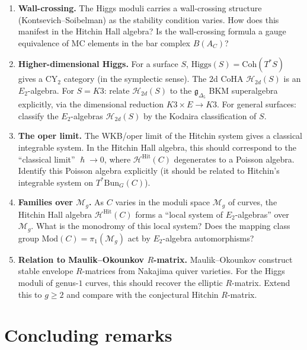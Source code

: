 \documentclass[11pt]{article}
\theoremstyle{garamondthm}
\theoremstyle{garamonddef}
\theoremstyle{garamondrem}
\newcommand{\Coh}{\mathrm{Coh}}
\newcommand{\CY}{\mathrm{CY}}
\newcommand{\Etwo}{E_2}
\newcommand{\cH}{\mathcal{H}}
\newcommand{\cM}{\mathcal{M}}
\newcommand{\frakg}{\mathfrak{g}}
\renewcommand{\hbar}{\hslash}
\newcommand{\Higgs}{\mathrm{Higgs}}
\newcommand{\Bun}{\mathrm{Bun}}
\newcommand{\Hit}{\mathrm{Hit}}
\begin{document}
\begin{enumerate}[label=\textbf{Q\arabic*.}]
\item \textbf{Wall-crossing.} The Higgs moduli carries a wall-crossing structure (Kontsevich--Soibelman) as the stability condition varies. How does this manifest in the Hitchin Hall algebra? Is the wall-crossing formula a gauge equivalence of MC elements in the bar complex $B(A_C)$?

\item \textbf{Higher-dimensional Higgs.} For a surface $S$, $\Higgs(S) = \Coh(T^*S)$ gives a $\CY_2$ category (in the symplectic sense). The $2$d CoHA $\cH_{2d}(S)$ is an $\Etwo$-algebra. For $S = K3$: relate $\cH_{2d}(S)$ to the $\frakg_{\Delta_5}$ BKM superalgebra explicitly, via the dimensional reduction $K3 \times E \to K3$. For general surfaces: classify the $\Etwo$-algebras $\cH_{2d}(S)$ by the Kodaira classification of $S$.

\item \textbf{The oper limit.} The WKB/oper limit of the Hitchin system gives a classical integrable system. In the Hitchin Hall algebra, this should correspond to the ``classical limit'' $\hbar \to 0$, where $\cH^{\Hit}(C)$ degenerates to a Poisson algebra. Identify this Poisson algebra explicitly (it should be related to Hitchin's integrable system on $T^*\Bun_G(C)$).

\item \textbf{Families over $\cM_g$.} As $C$ varies in the moduli space $\cM_g$ of curves, the Hitchin Hall algebra $\cH^{\Hit}(C)$ forms a ``local system of $\Etwo$-algebras'' over $\cM_g$. What is the monodromy of this local system? Does the mapping class group $\mathrm{Mod}(C) = \pi_1(\cM_g)$ act by $\Etwo$-algebra automorphisms?

\item \textbf{Relation to Maulik--Okounkov $R$-matrix.} Maulik--Okounkov construct stable envelope $R$-matrices from Nakajima quiver varieties. For the Higgs moduli of genus-$1$ curves, this should recover the elliptic $R$-matrix. Extend this to $g \geq 2$ and compare with the conjectural Hitchin $R$-matrix.

\end{enumerate}



\section{Concluding remarks}
\label{sec:conclusion}
\end{document}
